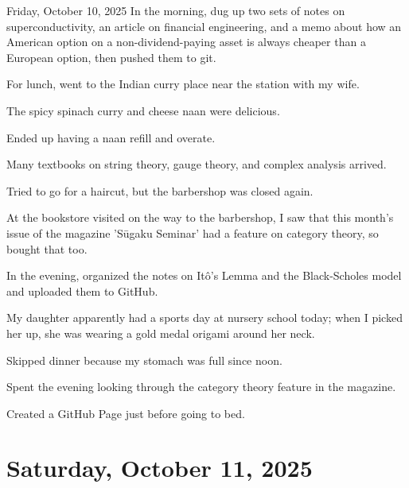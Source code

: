 \documentclass[dvipdfmx, autodetect-engine, aspectratio=169, 10.5pt]{beamer}
\begin{document}
\begin{frame}{Friday, October 10, 2025}
	\scriptsize
	In the morning, dug up two sets of notes on superconductivity, an article on financial engineering, and a memo about how an American option on a non-dividend-paying asset is always cheaper than a European option, then pushed them to git.

	For lunch, went to the Indian curry place near the station with my wife.

	The spicy spinach curry and cheese naan were delicious.

	Ended up having a naan refill and overate.

	Many textbooks on string theory, gauge theory, and complex analysis arrived.

	Tried to go for a haircut, but the barbershop was closed again.

	At the bookstore visited on the way to the barbershop, I saw that this month's issue of the magazine 'Sūgaku Seminar' had a feature on category theory, so bought that too.

	In the evening, organized the notes on Itô's Lemma and the Black-Scholes model and uploaded them to GitHub.

	My daughter apparently had a sports day at nursery school today; when I picked her up, she was wearing a gold medal origami around her neck.

	Skipped dinner because my stomach was full since noon.

	Spent the evening looking through the category theory feature in the magazine.

	Created a GitHub Page just before going to bed.
\end{frame}

\section{Saturday, October 11, 2025}
\end{document}
